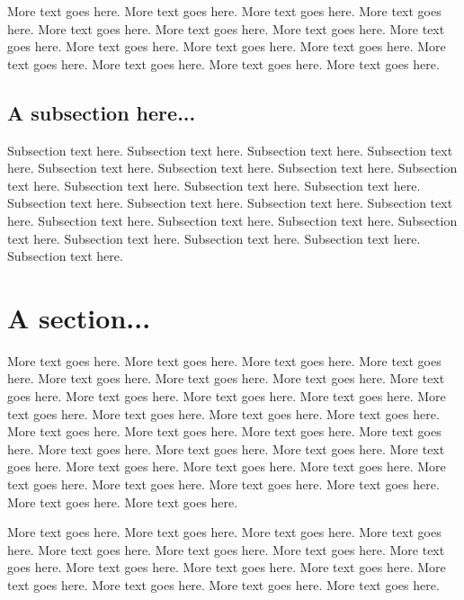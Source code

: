 \documentclass{chi-ext}
\begin{document}
More text goes here. More text goes here. More text goes here. More
text goes here. More text goes here. More text goes here. More text
goes here. More text goes here. More text goes here. More text goes
here. More text goes here. More text goes here. More text goes
here. More text goes here. More text goes here.

\subsection{A subsection here...}
Subsection text here. Subsection text here. Subsection text
here. Subsection text here. Subsection text here. Subsection text
here. Subsection text here. Subsection text here. Subsection text
here. Subsection text here. Subsection text here. Subsection text
here. Subsection text here. Subsection text here. Subsection text
here. Subsection text here. Subsection text here. Subsection text
here. Subsection text here. Subsection text here. Subsection text
here. Subsection text here. Subsection text here.

\section{A section...}
More text goes here. More text goes here. More text goes here. More
text goes here. More text goes here. More text goes here. More text
goes here. More text goes here. More text goes here. More text goes
here. More text goes here. More text goes here. More text goes
here. More text goes here. More text goes here. More text goes
here. More text goes here. More text goes here. More text goes
here. More text goes here. More text goes here. More text goes
here. More text goes here. More text goes here. More text goes
here. More text goes here. More text goes here. More text goes
here. More text goes here. More text goes here. More text goes
here. More text goes here.

More text goes here. More text goes here. More text goes here. More
text goes here. More text goes here. More text goes here. More text
goes here. More text goes here. More text goes here. More text goes
here. More text goes here. More text goes here. More text goes
here. More text goes here. More text goes here.
\end{document}

